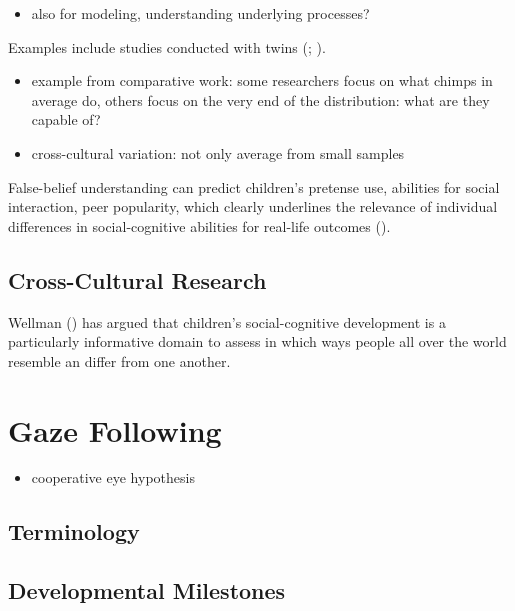 \documentclass[
]{scrbook}
\providecommand{\tightlist}{%
  \setlength{\itemsep}{0pt}\setlength{\parskip}{0pt}}
\begin{document}
\begin{itemize}
\tightlist
\item
  also for modeling, understanding underlying processes?
\end{itemize}

Examples include studies conducted with twins (; ).

\begin{itemize}
\tightlist
\item
  example from comparative work: some researchers focus on what chimps in average do, others focus on the very end of the distribution: what are they capable of?
\item
  cross-cultural variation: not only average from small samples
\end{itemize}

False-belief understanding can predict children's pretense use, abilities for social interaction, peer popularity, which clearly underlines the relevance of individual differences in social-cognitive abilities for real-life outcomes ().

\subsection{Cross-Cultural Research}\label{cross-cultural-research}

Wellman () has argued that children's social-cognitive development is a particularly informative domain to assess in which ways people all over the world resemble an differ from one another.

\section{Gaze Following}\label{gaze-following}

\begin{itemize}
\tightlist
\item
  cooperative eye hypothesis
\end{itemize}

\subsection{Terminology}\label{terminology-1}

\subsection{Developmental Milestones}\label{developmental-milestones-1}
\end{document}
